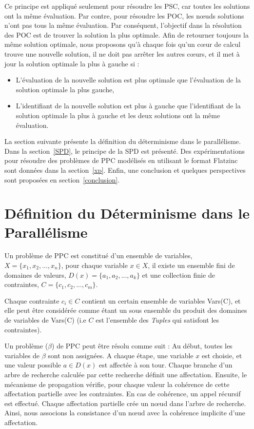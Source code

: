 \documentclass[parallelisme]{compas2014}
\begin{document}
Ce principe est appliqué seulement pour résoudre les PSC, car toutes les solutions ont la même évaluation. Par contre, pour résoudre les POC, les nœuds solutions n'ont pas tous la même évaluation. Par conséquent, l'objectif dans la résolution des POC est de trouver la solution la plus optimale. Afin de retourner toujours la même solution optimale, nous proposons qu'à chaque fois qu'un cœur de calcul trouve une nouvelle solution, il ne doit pas arrêter les autres cœurs, et il met à jour la solution optimale la plus à gauche si :

\begin{itemize}
\item L'évaluation de la nouvelle solution est plus optimale que l'évaluation de la solution optimale la plus gauche,
\item L'identifiant de la nouvelle solution est plus à gauche que l'identifiant de la solution optimale la plus à gauche et les deux solutions ont la même évaluation.
\end{itemize}

La section suivante présente la définition du déterminisme dans le parallélisme. Dans la section~\ref{SPD}, le principe de la SPD est présenté. Des expérimentations pour résoudre des problèmes de PPC modélisés en utilisant le format Flatzinc sont données dans la section~\ref{xp}. Enfin, une conclusion et quelques perspectives sont proposées en section~\ref{conclusion}.
\section{Définition du Déterminisme dans le Parallélisme}\label{de_pa}


Un problème de PPC est constitué d'un ensemble de variables, $X = \{x_1, x_2, ..., x_n\}$, pour chaque variable $x \in X$, il existe un ensemble fini de domaines de valeurs, $D(x) = \{a_1, a_2, ..., a_k\}$ et une collection finie de contraintes, $C = \{c_1, c_2, ..., c_m\}$.

Chaque contrainte $c_i \in C$ contient un certain ensemble de variables Vars(C), et elle peut être considérée comme étant un sous ensemble du produit des domaines de variables de Vars(C) (i.e $C$ est l'ensemble des \textit{Tuples} qui satisfont les contraintes).

Un problème ($\beta$) de PPC peut être résolu comme suit :
Au début, toutes les variables de $\beta$ sont non assignées. A chaque étape, une variable $x$ est choisie, et une valeur possible $a \in D(x)$ est affectée à son tour. Chaque branche d'un arbre de recherche calculée par cette recherche définit une affectation. Ensuite, le mécanisme de propagation vérifie, pour chaque valeur la cohérence de cette affectation partielle avec les contraintes. En cas de cohérence, un appel récursif est effectué. Chaque affectation partielle crée un nœud dans l'arbre de recherche. Ainsi, nous associons la consistance d'un nœud avec la cohérence implicite d'une affectation.
\end{document}
